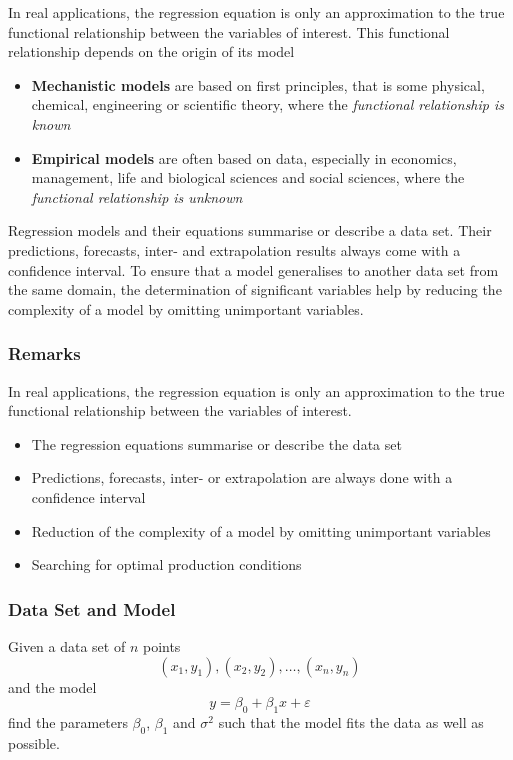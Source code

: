 \documentclass[11pt]{article}
\theoremstyle{definition}
\begin{document}
In real applications, the regression equation is only an approximation to the true functional relationship between the variables of interest. This functional relationship depends on the origin of its model
\begin{itemize}[nosep]
	\item \textbf{Mechanistic models} are based on first principles, that is some physical, chemical, engineering or scientific theory, where the \textit{functional relationship is known}
	\item \textbf{Empirical models} are often based on data, especially in economics, management, life and biological sciences and social sciences, where the \textit{functional relationship is unknown}
\end{itemize}
Regression models and their equations summarise or describe a data set. Their predictions, forecasts, inter- and extrapolation results always come with a confidence interval. To ensure that a model generalises to another data set from the same domain, the determination of significant variables help by reducing the complexity of a model by omitting unimportant variables.

\subsubsection{Remarks}
In real applications, the regression equation is only an approximation to the true functional relationship between the variables of interest.
\begin{itemize}
	\item The regression equations summarise or describe the data set
	\item Predictions, forecasts, inter- or extrapolation are always done with a confidence interval
	\item Reduction of the complexity of a model by omitting unimportant variables
	\item Searching for optimal production conditions
\end{itemize}

\subsubsection{Data Set and Model}
Given a data set of $n$ points
\begin{equation*}
	(x_1,y_1), (x_2,y_2), \dots, (x_n,y_n)
\end{equation*}
and the model
\begin{equation*}
	y = \beta_0 + \beta_1 x + \varepsilon
\end{equation*}
find the parameters $\beta_0$, $\beta_1$ and $\sigma^2$ such that the model fits the data as well as possible.
\end{document}
